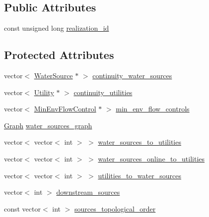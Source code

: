 \subsection*{Public Attributes}
\begin{DoxyCompactItemize}
\item 
const unsigned long \mbox{\hyperlink{classContinuityModel_a7b6c99bf256f6c6b633ebb78282f43c7}{realization\+\_\+id}}
\end{DoxyCompactItemize}
\subsection*{Protected Attributes}
\begin{DoxyCompactItemize}
\item 
vector$<$ \mbox{\hyperlink{classWaterSource}{Water\+Source}} $\ast$ $>$ \mbox{\hyperlink{classContinuityModel_a3980284a9dd08bae4e76398d1b0d6f55}{continuity\+\_\+water\+\_\+sources}}
\item 
vector$<$ \mbox{\hyperlink{classUtility}{Utility}} $\ast$ $>$ \mbox{\hyperlink{classContinuityModel_adc77a0214d553a961035ce86c93cf9be}{continuity\+\_\+utilities}}
\item 
vector$<$ \mbox{\hyperlink{classMinEnvFlowControl}{Min\+Env\+Flow\+Control}} $\ast$ $>$ \mbox{\hyperlink{classContinuityModel_afc991e5c0d144020e49a97751a04b302}{min\+\_\+env\+\_\+flow\+\_\+controls}}
\item 
\mbox{\hyperlink{classGraph}{Graph}} \mbox{\hyperlink{classContinuityModel_a563401588c6fa622f03393909a3522db}{water\+\_\+sources\+\_\+graph}}
\item 
vector$<$ vector$<$ int $>$ $>$ \mbox{\hyperlink{classContinuityModel_ae8516bcbbf52650190277fc8b06c1843}{water\+\_\+sources\+\_\+to\+\_\+utilities}}
\item 
vector$<$ vector$<$ int $>$ $>$ \mbox{\hyperlink{classContinuityModel_a6d80a7e50e022e2cdb5e912d5b3b5cf0}{water\+\_\+sources\+\_\+online\+\_\+to\+\_\+utilities}}
\item 
vector$<$ vector$<$ int $>$ $>$ \mbox{\hyperlink{classContinuityModel_a5cf4be0afa886eb09a3e143f54c29044}{utilities\+\_\+to\+\_\+water\+\_\+sources}}
\item 
vector$<$ int $>$ \mbox{\hyperlink{classContinuityModel_af00ea62ac8e2e398591ff608c2a203ef}{downstream\+\_\+sources}}
\item 
const vector$<$ int $>$ \mbox{\hyperlink{classContinuityModel_a6605cb6aae0370eb84d2e8bf7d6d651e}{sources\+\_\+topological\+\_\+order}}
\item 

\end{DoxyCompactItemize}
